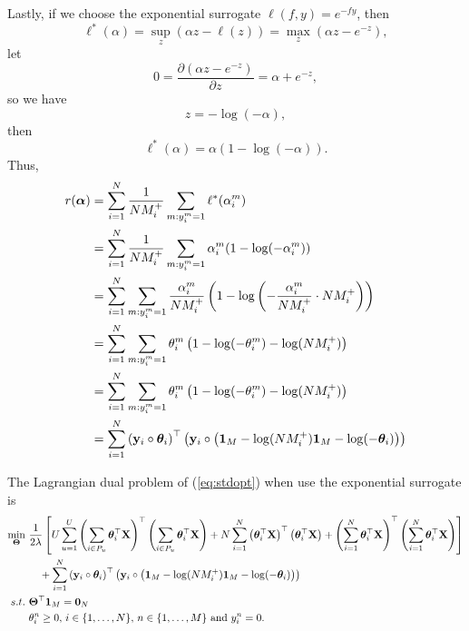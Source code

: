 Lastly, if we choose the exponential surrogate $\ell(f, y) = e^{-fy}$, then
\begin{equation*}
\ell^*(\alpha) = \sup_z \left(\alpha z - \ell(z) \right) = \max_z \left(\alpha z - e^{-z} \right),
\end{equation*}
let 
\begin{equation*}
0 = \frac{\partial (\alpha z - e^{-z})}{\partial z} = \alpha + e^{-z},
\end{equation*}
so we have
\begin{equation*}
z = -\log(-\alpha),
\end{equation*}
then
\begin{equation*}
\ell^*(\alpha) = \alpha ( 1 - \log(-\alpha) ).
\end{equation*}
Thus,
\begin{equation*}
\begin{aligned}
r({\bm{\alpha}})
&= \sum_{i=1}^N \frac{1}{N M_i^+} \sum_{m: y_i^m = 1} \ell^*(\alpha_i^m) \\
&= \sum_{i=1}^N \frac{1}{N M_i^+} \sum_{m: y_i^m = 1} \alpha_i^m (1 - \log(-\alpha_i^m)) \\
&= \sum_{i=1}^N \sum_{m: y_i^m = 1} \frac{\alpha_i^m}{N M_i^+} \left(1 - \log \left( -\frac{\alpha_i^m}{N M_i^+} \cdot N M_i^+ \right) \right) \\
&= \sum_{i=1}^N \sum_{m: y_i^m = 1} \theta_i^m \left(1 - \log(-\theta_i^m) - \log(N M_i^+) \right) \\
&= \sum_{i=1}^N \sum_{m: y_i^m = 1} \theta_i^m \left(1 - \log(-\theta_i^m) - \log(N M_i^+) \right) \\
&= \sum_{i=1}^N \left( \mathbf{y}_i \circ \bm{\theta}_i \right)^\top 
                \left( \mathbf{y}_i \circ \left(\mathbf{1}_M - \log(N M_i^+) \mathbf{1}_M - \log(-\bm{\theta}_i) \right) \right) \\
\end{aligned}
\end{equation*}

The Lagrangian dual problem of (\ref{eq:stdopt}) when use the exponential surrogate is
\begin{equation}
\label{eq:dual}
\begin{aligned}
\min_{\mathbf{\Theta}} \ & \frac{1}{2 \lambda} \left[
     U \sum_{u=1}^U \left( \sum_{i \in P_u} \bm{\theta}_i^\top \mathbf{X} \right)^\top \left( \sum_{i \in P_u} \bm{\theta}_i^\top \mathbf{X} \right)
   + N \sum_{i=1}^N \left( \bm{\theta}_i^\top \mathbf{X} \right)^\top \left( \bm{\theta}_i^\top \mathbf{X} \right)
   + \left( \sum_{i=1}^N \bm{\theta}_i^\top \mathbf{X} \right)^\top \left( \sum_{i=1}^N \bm{\theta}_i^\top \mathbf{X} \right) \right] \\
& \hspace{1em}
   + \sum_{i=1}^N \left( \mathbf{y}_i \circ \bm{\theta}_i \right)^\top 
     \left( \mathbf{y}_i \circ \left(\mathbf{1}_M - \log(N M_i^+) \mathbf{1}_M - \log(-\bm{\theta}_i) \right) \right) \\
s.t. \ & \mathbf{\Theta}^\top \mathbf{1}_M = \mathbf{0}_N \\
           & \theta_i^n \ge 0, \, i \in \{1,\dots,N\}, \, n \in \{1,\dots,M\} \ \mathrm{and} \ y_i^n = 0.
\end{aligned}
\end{equation}

